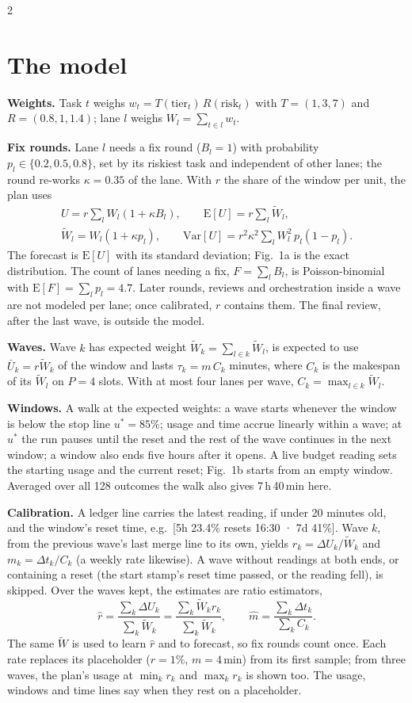 \documentclass[9pt,a4paper]{extarticle}
\newcommand{\para}[1]{\textsf{\textbf{#1}}\enspace}
\begin{document}
\begin{multicols}{2}
\section{The model}
\para{Weights.} Task $t$ weighs $w_t=T(\text{tier}_t)\,R(\text{risk}_t)$ with $T=(1,3,7)$ and $R=(0.8,1,1.4)$; lane $l$ weighs $W_l=\sum_{t\in l}w_t$.

\para{Fix rounds.} Lane $l$ needs a fix round ($B_l=1$) with probability $p_l\in\{0.2,0.5,0.8\}$, set by its riskiest task and independent of other lanes; the round re-works $\kappa=0.35$ of the lane. With $r$ the share of the window per unit, the plan uses
\begin{gather*}
U=r\sum_l W_l(1+\kappa B_l),\qquad \mathrm{E}[U]=r\sum_l \widetilde W_l,\\
\widetilde W_l=W_l(1+\kappa p_l),\qquad \mathrm{Var}[U]=r^2\kappa^2\sum_l W_l^2\,p_l(1-p_l).
\end{gather*}
The forecast is $\mathrm{E}[U]$ with its standard deviation; Fig.~1a is the exact distribution. The count of lanes needing a fix, $F=\sum_l B_l$, is Poisson-binomial with $\mathrm{E}[F]=\sum_l p_l=4.7$. Later rounds, reviews and orchestration inside a wave are not modeled per lane; once calibrated, $r$ contains them. The final review, after the last wave, is outside the model.

\para{Waves.} Wave $k$ has expected weight $\widetilde W_k=\sum_{l\in k}\widetilde W_l$, is expected to use $\bar U_k=r\widetilde W_k$ of the window and lasts $\tau_k=m\,C_k$ minutes, where $C_k$ is the makespan of its $\widetilde W_l$ on $P=4$ slots. With at most four lanes per wave, $C_k=\max_{l\in k}\widetilde W_l$.

\para{Windows.} A walk at the expected weights: a wave starts whenever the window is below the stop line $u^*=85\%$; usage and time accrue linearly within a wave; at $u^*$ the run pauses until the reset and the rest of the wave continues in the next window; a window also ends five hours after it opens. A live budget reading sets the starting usage and the current reset; Fig.~1b starts from an empty window. Averaged over all 128 outcomes the walk also gives 7\,h\,40\,min here.

\para{Calibration.} A ledger line carries the latest reading, if under 20 minutes old, and the window's reset time, e.g.\ \textsf{[5h 23.4\% resets 16:30 · 7d 41\%]}. Wave $k$, from the previous wave's last merge line to its own, yields $r_k=\Delta U_k/\widetilde W_k$ and $m_k=\Delta t_k/C_k$ (a weekly rate likewise). A wave without readings at both ends, or containing a reset (the start stamp's reset time passed, or the reading fell), is skipped. Over the waves kept, the estimates are ratio estimators,
\[
\hat r=\frac{\sum_k \Delta U_k}{\sum_k \widetilde W_k}=\frac{\sum_k \widetilde W_k r_k}{\sum_k \widetilde W_k},\qquad \hat m=\frac{\sum_k \Delta t_k}{\sum_k C_k}.
\]
The same $\widetilde W$ is used to learn $\hat r$ and to forecast, so fix rounds count once. Each rate replaces its placeholder ($r=1\%$, $m=4$\,min) from its first sample; from three waves, the plan's usage at $\min_k r_k$ and $\max_k r_k$ is shown too. The usage, windows and time lines say when they rest on a placeholder.


\end{multicols}
\end{document}
